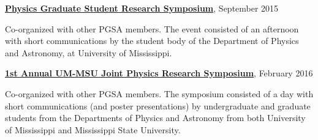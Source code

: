 \documentclass[10pt]{article}
\renewcommand{\section}[1]{\pagebreak[3]%
    \vspace{1.3\baselineskip}%
    \phantomsection\addcontentsline{toc}{section}{#1}%
    \noindent\llap{\scshape\smash{\parbox[t]{\marginparwidth}{\hyphenpenalty=10000\raggedright #1}}}%
    \vspace{-\baselineskip}\par}
\newcommand{\halfblankline}{\quad\vspace{-0.5\baselineskip}\pagebreak[3]}
\begin{document}
\halfblankline

\href{http://dos.orgsync.com/org/pgsa/ResearchSymposium2015}
{\textbf{Physics Graduate Student Research Symposium}},
\hfill{September 2015}

\begin{innerlist}
    \item Co-organized with other PGSA members. The event consisted of an afternoon
    with short communications by the student body of the Department of Physics and
    Astronomy, at University of Mississippi.
\end{innerlist}

\halfblankline

\href{http://dos.orgsync.com/org/pgsa/UM_MSU_SYMP}
{\textbf{1st Annual UM-MSU Joint Physics Research Symposium}},
\hfill{February 2016}

\begin{innerlist}
    \item Co-organized with other PGSA members.
    The symposium consisted of a day with short communications (and poster presentations)
    by undergraduate and graduate students from the Departments of Physics
    and Astronomy from both University of Mississippi and Mississippi State
    University.
\end{innerlist}




\end{document}
